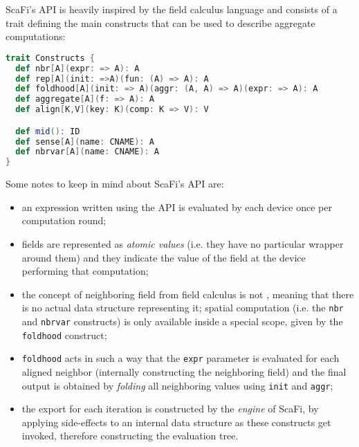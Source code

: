 ScaFi's API is heavily inspired by the field calculus language and consists of a trait defining the main constructs that can be used to describe aggregate computations:
%
\begin{lstlisting}[frame=single, language=scala]
trait Constructs {
  def nbr[A](expr: => A): A
  def rep[A](init: =>A)(fun: (A) => A): A
  def foldhood[A](init: => A)(aggr: (A, A) => A)(expr: => A): A
  def aggregate[A](f: => A): A
  def align[K,V](key: K)(comp: K => V): V

  def mid(): ID
  def sense[A](name: CNAME): A
  def nbrvar[A](name: CNAME): A
}
\end{lstlisting}
%
Some notes to keep in mind about ScaFi's API are:
%
\begin{itemize}
    \item an expression written using the API is evaluated by each device once per computation round;
    \item fields are represented as \textit{atomic values} (i.e. they have no particular wrapper around them) and they indicate the value of the field at the device performing that computation;
    \item the concept of neighboring field from field calculus is not , meaning that there is no actual data structure representing it; spatial computation (i.e. the \texttt{nbr} and \texttt{nbrvar} constructs) is only available inside a special scope, given by the \texttt{foldhood} construct;
    \item \texttt{foldhood} acts in such a way that the \texttt{expr} parameter is evaluated for each aligned neighbor (internally constructing the neighboring field) and the final output is obtained by \textit{folding} all neighboring values using \texttt{init} and \texttt{aggr};
    \item the export for each iteration is constructed by the \textit{engine} of ScaFi, by applying side-effects to an internal data structure as these constructs get invoked, therefore constructing the evaluation tree.
\end{itemize}

